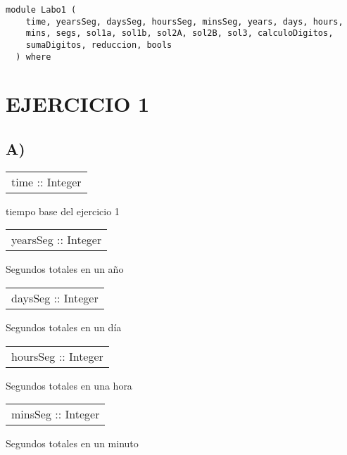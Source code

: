 \label{module:Labo1}
\haddockbeginheader
{\haddockverb\begin{verbatim}
module Labo1 (
    time, yearsSeg, daysSeg, hoursSeg, minsSeg, years, days, hours,
    mins, segs, sol1a, sol1b, sol2A, sol2B, sol3, calculoDigitos,
    sumaDigitos, reduccion, bools
  ) where\end{verbatim}}
\haddockendheader

\section{EJERCICIO 1}
\subsection{A)}
\begin{haddockdesc}
\item[\begin{tabular}{@{}l}
time :: Integer
\end{tabular}]
{\haddockbegindoc
tiempo base del ejercicio 1\par}
\end{haddockdesc}
\begin{haddockdesc}
\item[\begin{tabular}{@{}l}
yearsSeg :: Integer
\end{tabular}]
{\haddockbegindoc
Segundos totales en un año\par}
\end{haddockdesc}
\begin{haddockdesc}
\item[\begin{tabular}{@{}l}
daysSeg :: Integer
\end{tabular}]
{\haddockbegindoc
Segundos totales en un día\par}
\end{haddockdesc}
\begin{haddockdesc}
\item[\begin{tabular}{@{}l}
hoursSeg :: Integer
\end{tabular}]
{\haddockbegindoc
Segundos totales en una hora\par}
\end{haddockdesc}
\begin{haddockdesc}
\item[\begin{tabular}{@{}l}
minsSeg :: Integer
\end{tabular}]
{\haddockbegindoc
Segundos totales en un minuto\par}
\end{haddockdesc}
